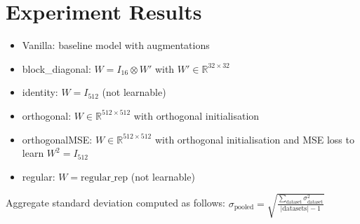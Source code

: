 \documentclass{article}
\begin{document}
\section*{Experiment Results}
\begin{itemize}
    \item Vanilla: baseline model with augmentations
    \item block\_diagonal: $W=I_{16}\otimes W'$ with $W'\in\mathbb{R}^{32\times32}$
    \item identity: $W=I_{512}$ (not learnable)
    \item orthogonal: $W\in\mathbb{R}^{512\times512}$ with orthogonal initialisation
    \item orthogonalMSE: $W\in\mathbb{R}^{512\times512}$ with orthogonal initialisation and MSE loss to learn $W^2=I_{512}$
    \item regular: $W=\text{regular\_rep}$ (not learnable)
\end{itemize}
Aggregate standard deviation computed as follows: $\sigma_{\text{pooled}}=\sqrt{\frac{\sum_{\text{dataset}}\sigma_{\text{dataset}}^2}{|\text{datasets}|-1}}$
\end{document}
